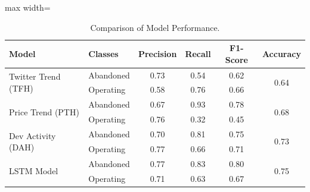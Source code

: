 \begin{table}[h]
    \centering
    \caption{Comparison of Model Performance.}
    \begin{adjustbox}{max width=\textwidth}
        \begin{tabular}{llcccc}
            \toprule
            \textbf{Model} & \textbf{Classes} & \textbf{Precision} & \textbf{Recall} & \textbf{F1-Score} & \textbf{Accuracy} \\
            \midrule
            \multirow{2}{*}{Twitter Trend (TFH)} & Abandoned  & 0.73 & 0.54 & 0.62 & \multirow{2}{*}{0.64} \\ & Operating  & 0.58 & 0.76 & 0.66 &                     \\
            \midrule
            \multirow{2}{*}{Price Trend (PTH)} & Abandoned  & 0.67 & 0.93 & 0.78 & \multirow{2}{*}{0.68} \\ & Operating  & 0.76 & 0.32 & 0.45 &                     \\
            \midrule
            \multirow{2}{*}{Dev Activity (DAH)} & Abandoned  & 0.70 & 0.81 & 0.75 & \multirow{2}{*}{0.73} \\ & Operating  & 0.77 & 0.66 & 0.71 &                     \\
            \midrule
            \multirow{2}{*}{LSTM Model} & Abandoned  & 0.77 & 0.83 & 0.80 & \multirow{2}{*}{0.75} \\ & Operating  & 0.71 & 0.63 & 0.67 &                     \\
            \bottomrule
        \end{tabular}
    \end{adjustbox}
    \label{tab:mlmodel_comparison}
\end{table}

